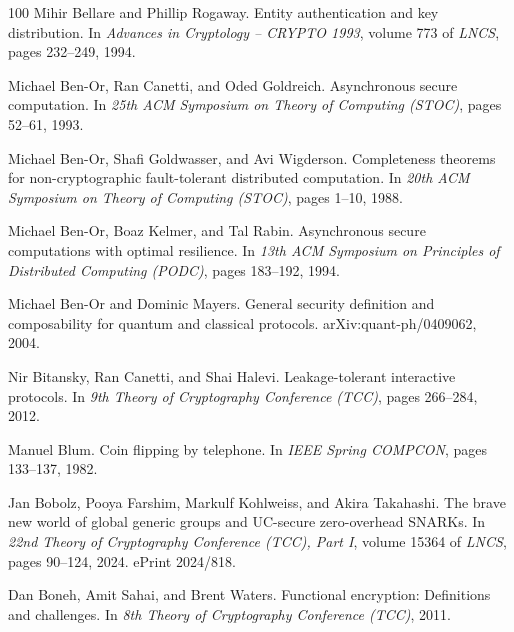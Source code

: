 \documentclass[11pt,a4paper]{article}
\begin{document}
\begin{thebibliography}{100}
Mihir Bellare and Phillip Rogaway.
\newblock Entity authentication and key distribution.
\newblock In {\em Advances in Cryptology -- CRYPTO 1993}, volume 773 of {\em
  LNCS}, pages 232--249, 1994.

Michael Ben-Or, Ran Canetti, and Oded Goldreich.
\newblock Asynchronous secure computation.
\newblock In {\em 25th ACM Symposium on Theory of Computing (STOC)}, pages
  52--61, 1993.

Michael Ben-Or, Shafi Goldwasser, and Avi Wigderson.
\newblock Completeness theorems for non-cryptographic fault-tolerant
  distributed computation.
\newblock In {\em 20th ACM Symposium on Theory of Computing (STOC)}, pages
  1--10, 1988.

Michael Ben-Or, Boaz Kelmer, and Tal Rabin.
\newblock Asynchronous secure computations with optimal resilience.
\newblock In {\em 13th ACM Symposium on Principles of Distributed Computing
  (PODC)}, pages 183--192, 1994.

Michael Ben-Or and Dominic Mayers.
\newblock General security definition and composability for quantum and
  classical protocols.
\newblock arXiv:quant-ph/0409062, 2004.

Nir Bitansky, Ran Canetti, and Shai Halevi.
\newblock Leakage-tolerant interactive protocols.
\newblock In {\em 9th Theory of Cryptography Conference (TCC)}, pages 266--284,
  2012.

Manuel Blum.
\newblock Coin flipping by telephone.
\newblock In {\em IEEE Spring COMPCON}, pages 133--137, 1982.

Jan Bobolz, Pooya Farshim, Markulf Kohlweiss, and Akira Takahashi.
\newblock The brave new world of global generic groups and {UC}-secure
  zero-overhead {SNARKs}.
\newblock In {\em 22nd Theory of Cryptography Conference (TCC), Part I}, volume
  15364 of {\em LNCS}, pages 90--124, 2024.
\newblock ePrint 2024/818.

Dan Boneh, Amit Sahai, and Brent Waters.
\newblock Functional encryption: Definitions and challenges.
\newblock In {\em 8th Theory of Cryptography Conference (TCC)}, 2011.


\end{thebibliography}
\end{document}
